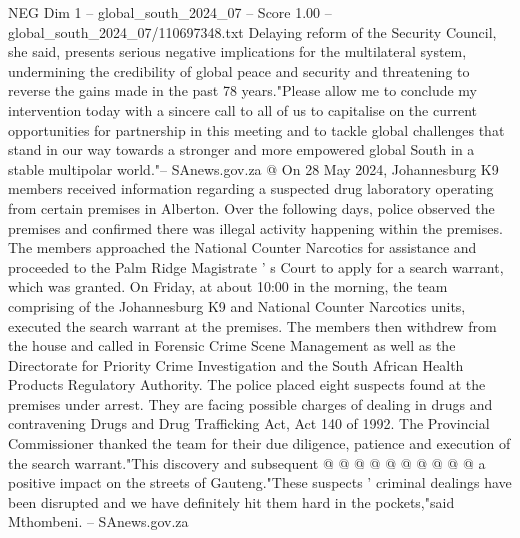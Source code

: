 \begin{textsample}{NEG Dim 1 – global\_south\_2024\_07 – Score 1.00 – global\_south\_2024\_07/110697348.txt}
Delaying reform of the Security Council, she said, presents serious negative implications for the multilateral system, undermining the credibility of global peace and security and threatening to reverse the gains made in the past 78 years."Please allow me to conclude my intervention today with a sincere call to all of us to capitalise on the current opportunities for partnership in this meeting and to tackle global challenges that stand in our way towards a stronger and more empowered global South in a stable multipolar world."-- SAnews.gov.za @ On 28 May 2024, Johannesburg K9 members received information regarding a suspected drug laboratory operating from certain premises in Alberton.
Over the following days, police observed the premises and confirmed there was illegal activity happening within the premises.
The members approached the National Counter Narcotics for assistance and proceeded to the Palm Ridge Magistrate ' s Court to apply for a search warrant, which was granted.
On Friday, at about 10:00 in the morning, the team comprising of the Johannesburg K9 and National Counter Narcotics units, executed the search warrant at the premises.
The members then withdrew from the house and called in Forensic Crime Scene Management as well as the Directorate for Priority Crime Investigation and the South African Health Products Regulatory Authority.
The police placed eight suspects found at the premises under arrest.
They are facing possible charges of dealing in drugs and contravening Drugs and Drug Trafficking Act, Act 140 of 1992.
The Provincial Commissioner thanked the team for their due diligence, patience and execution of the search warrant."This discovery and subsequent @ @ @ @ @ @ @ @ @ @ a positive impact on the streets of Gauteng."These suspects ' criminal dealings have been disrupted and we have definitely hit them hard in the pockets,"said Mthombeni. -- SAnews.gov.za

\end{textsample}
